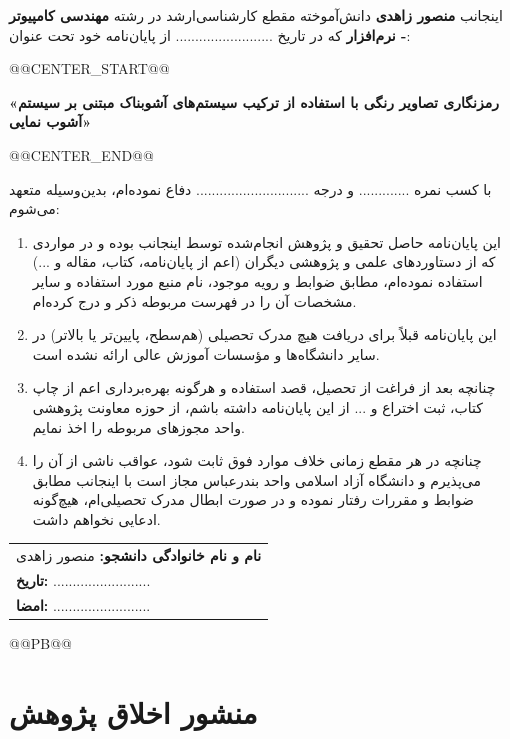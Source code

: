 اینجانب \textbf{منصور زاهدی} دانش‌آموخته مقطع کارشناسی‌ارشد در رشته \textbf{مهندسی کامپیوتر - نرم‌افزار} که در تاریخ ......................... از پایان‌نامه خود تحت عنوان:


@@CENTER_START@@


\textbf{«رمزنگاری تصاویر رنگی با استفاده از ترکیب سیستم‌های آشوبناک مبتنی بر سیستم آشوب نمایی»}


@@CENTER_END@@


با کسب نمره ............. و درجه ............................. دفاع نموده‌ام، بدین‌وسیله متعهد می‌شوم:

\begin{enumerate}
    \item این پایان‌نامه حاصل تحقیق و پژوهش انجام‌شده توسط اینجانب بوده و در مواردی که از دستاوردهای علمی و پژوهشی دیگران (اعم از پایان‌نامه، کتاب، مقاله و ...) استفاده نموده‌ام، مطابق ضوابط و رویه موجود، نام منبع مورد استفاده و سایر مشخصات آن را در فهرست مربوطه ذکر و درج کرده‌ام.
    \item این پایان‌نامه قبلاً برای دریافت هیچ مدرک تحصیلی (هم‌سطح، پایین‌تر یا بالاتر) در سایر دانشگاه‌ها و مؤسسات آموزش عالی ارائه نشده است.
    \item چنانچه بعد از فراغت از تحصیل، قصد استفاده و هرگونه بهره‌برداری اعم از چاپ کتاب، ثبت اختراع و ... از این پایان‌نامه داشته باشم، از حوزه معاونت پژوهشی واحد مجوزهای مربوطه را اخذ نمایم.
    \item چنانچه در هر مقطع زمانی خلاف موارد فوق ثابت شود، عواقب ناشی از آن را می‌پذیرم و دانشگاه آزاد اسلامی واحد بندرعباس مجاز است با اینجانب مطابق ضوابط و مقررات رفتار نموده و در صورت ابطال مدرک تحصیلی‌ام، هیچ‌گونه ادعایی نخواهم داشت.
\end{enumerate}

\vspace{1cm}

\begin{flushleft}
\begin{tabular}{l}
\textbf{نام و نام خانوادگی دانشجو:} منصور زاهدی \\
\textbf{تاریخ:} ......................... \\
\textbf{امضا:} ......................... \\
\end{tabular}
\end{flushleft}



@@PB@@

\chapter*{منشور اخلاق پژوهش}

